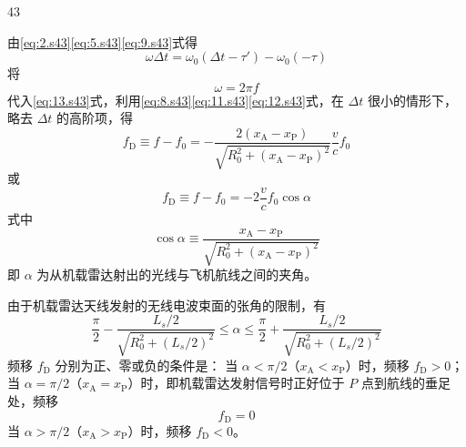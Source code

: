 \begin{solution}{43}
\begin{subsolution}
        由\eqref{eq:2.s43}\eqref{eq:5.s43}\eqref{eq:9.s43}式得
        \begin{equation}
            \omega\Delta t = \omega_{0}(\Delta t - \tau') - \omega_{0}(-\tau)
            \label{eq:13.s43}
        \end{equation}
        将
        \begin{equation}
            \omega = 2\pi f
            \label{eq:14.s43}
        \end{equation}
        代入\eqref{eq:13.s43}式，利用\eqref{eq:8.s43}\eqref{eq:11.s43}\eqref{eq:12.s43}式，在 $\Delta t$ 很小的情形下，略去 $\Delta t$ 的高阶项，得
        \begin{equation}
            f_{\mathrm{D}} \equiv f - f_{0} = -\frac{2(x_{\mathrm{A}} - x_{\mathrm{P}})}{\sqrt{R_{0}^{2} + (x_{\mathrm{A}} - x_{\mathrm{P}})^{2}}}\frac{v}{c}f_{0}
            \label{eq:15.s43}
        \end{equation}
        或
        \begin{equation}
            f_{\mathrm{D}} \equiv f - f_{0} = -2\frac{v}{c}f_{0}\cos\alpha
            \label{eq:16.s43}
        \end{equation}
        式中
        \begin{equation}
            \cos\alpha \equiv \frac{x_{\mathrm{A}} - x_{\mathrm{P}}}{\sqrt{R_{0}^{2} + (x_{\mathrm{A}} - x_{\mathrm{P}})^{2}}}
            \label{eq:17.s43}
        \end{equation}
        即 $\alpha$ 为从机载雷达射出的光线与飞机航线之间的夹角。
    \end{subsolution}
    \begin{subsolution}
        由于机载雷达天线发射的无线电波束面的张角的限制，有
        \begin{equation}
            \frac{\pi}{2} - \frac{L_{s}/2}{\sqrt{R_{0}^{2} + (L_{s}/2)^{2}}} \leq \alpha \leq \frac{\pi}{2} + \frac{L_{s}/2}{\sqrt{R_{0}^{2} + (L_{s}/2)^{2}}}
            \label{eq:18.s43}
        \end{equation}
        频移 $f_{\mathrm{D}}$ 分别为正、零或负的条件是：
        当 $\alpha < \pi/2$（$x_{\mathrm{A}} < x_{\mathrm{P}}$）时，频移 $f_{\mathrm{D}} > 0$；
        当 $\alpha = \pi/2$（$x_{\mathrm{A}} = x_{\mathrm{P}}$）时，即机载雷达发射信号时正好位于 $P$ 点到航线的垂足处，频移
        \begin{equation}
            f_{\mathrm{D}} = 0
            \label{eq:19.s43}
        \end{equation}
        当 $\alpha > \pi/2$（$x_{\mathrm{A}} > x_{\mathrm{P}}$）时，频移 $f_{\mathrm{D}} < 0$。


\end{subsolution}
\end{solution}
